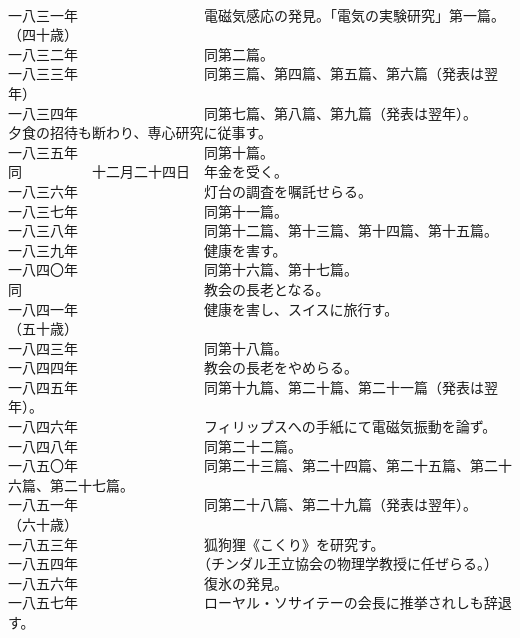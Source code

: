 \documentclass[8pt]{extreport}
\begin{document}
\begin{CJK}{UTF8}{min}
\\	一八三一年　　　　　　　　　電磁気感応の発見。「電気の実験研究」第一篇。
\\	（四十歳）
\\	一八三二年　　　　　　　　　同第二篇。
\\	一八三三年　　　　　　　　　同第三篇、第四篇、第五篇、第六篇（発表は翌年）
\\	一八三四年　　　　　　　　　同第七篇、第八篇、第九篇（発表は翌年）。
\\	夕食の招待も断わり、専心研究に従事す。
\\	一八三五年　　　　　　　　　同第十篇。
\\	同　　　　　十二月二十四日　年金を受く。
\\	一八三六年　　　　　　　　　灯台の調査を嘱託せらる。
\\	一八三七年　　　　　　　　　同第十一篇。
\\	一八三八年　　　　　　　　　同第十二篇、第十三篇、第十四篇、第十五篇。
\\	一八三九年　　　　　　　　　健康を害す。
\\	一八四〇年　　　　　　　　　同第十六篇、第十七篇。
\\	同　　　　　　　　　　　　　教会の長老となる。
\\	一八四一年　　　　　　　　　健康を害し、スイスに旅行す。
\\	（五十歳）
\\	一八四三年　　　　　　　　　同第十八篇。
\\	一八四四年　　　　　　　　　教会の長老をやめらる。
\\	一八四五年　　　　　　　　　同第十九篇、第二十篇、第二十一篇（発表は翌年）。
\\	一八四六年　　　　　　　　　フィリップスへの手紙にて電磁気振動を論ず。
\\	一八四八年　　　　　　　　　同第二十二篇。
\\	一八五〇年　　　　　　　　　同第二十三篇、第二十四篇、第二十五篇、第二十六篇、第二十七篇。
\\	一八五一年　　　　　　　　　同第二十八篇、第二十九篇（発表は翌年）。
\\	（六十歳）
\\	一八五三年　　　　　　　　　狐狗狸《こくり》を研究す。
\\	一八五四年　　　　　　　　　（チンダル王立協会の物理学教授に任ぜらる。）
\\	一八五六年　　　　　　　　　復氷の発見。
\\	一八五七年　　　　　　　　　ローヤル・ソサイテーの会長に推挙されしも辞退す。

\end{CJK}
\end{document}
